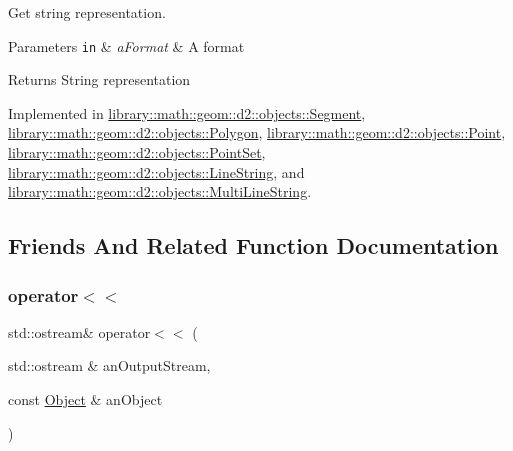 Get string representation. 


\begin{DoxyParams}[1]{Parameters}
\mbox{\tt in}  & {\em a\+Format} & A format \\
\hline
\end{DoxyParams}
\begin{DoxyReturn}{Returns}
String representation 
\end{DoxyReturn}


Implemented in \hyperlink{classlibrary_1_1math_1_1geom_1_1d2_1_1objects_1_1_segment_a6efb82e3e5e5d97214b827bc6f8574e3}{library\+::math\+::geom\+::d2\+::objects\+::\+Segment}, \hyperlink{classlibrary_1_1math_1_1geom_1_1d2_1_1objects_1_1_polygon_acef17857f29323e985fba23441ed1171}{library\+::math\+::geom\+::d2\+::objects\+::\+Polygon}, \hyperlink{classlibrary_1_1math_1_1geom_1_1d2_1_1objects_1_1_point_ae645a37f426dac123d566fb5511d595d}{library\+::math\+::geom\+::d2\+::objects\+::\+Point}, \hyperlink{classlibrary_1_1math_1_1geom_1_1d2_1_1objects_1_1_point_set_a4eeece63192481627cb0f991a4eef1a4}{library\+::math\+::geom\+::d2\+::objects\+::\+Point\+Set}, \hyperlink{classlibrary_1_1math_1_1geom_1_1d2_1_1objects_1_1_line_string_a13c0a7c5b8da7724b5a2dd2933064768}{library\+::math\+::geom\+::d2\+::objects\+::\+Line\+String}, and \hyperlink{classlibrary_1_1math_1_1geom_1_1d2_1_1objects_1_1_multi_line_string_a71d1e434196bb8d67054ad28d8aa59a6}{library\+::math\+::geom\+::d2\+::objects\+::\+Multi\+Line\+String}.



\subsection{Friends And Related Function Documentation}
\mbox{\label{classlibrary_1_1math_1_1geom_1_1d2_1_1_object_a418df9bf4a73078f3d494edef1743f8d}} 
\subsubsection{\texorpdfstring{operator$<$$<$}{operator<<}}
{\footnotesize\ttfamily std\+::ostream\& operator$<$$<$ (\begin{DoxyParamCaption}\item[{std\+::ostream \&}]{an\+Output\+Stream,  }\item[{const \hyperlink{classlibrary_1_1math_1_1geom_1_1d2_1_1_object}{Object} \&}]{an\+Object }\end{DoxyParamCaption})\hspace{0.3cm}{\ttfamily [friend]}}



